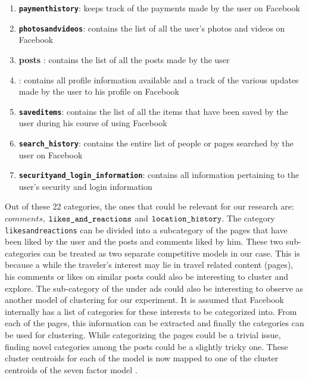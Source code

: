 \begin{enumerate}[i]
   \item \textbf{\texttt{payment\textunderscore history}}: keeps track of the payments made by the user on Facebook
   \item \textbf{\texttt{photos\textunderscore and\textunderscore videos}}: contains the list of all the user's photos and videos on Facebook
   \item \textbf{posts} : contains the list of all the posts made by the user
   \item \textbf{}: contains all profile information available and a track of the various updates made by the user to his profile on Facebook
   \item \textbf{\texttt{saved\textunderscore items}}: contains the list of all the items that have been saved by the user during his course of using Facebook
   \item \textbf{\texttt{search{\_}history}}: contains the entire list of people or pages searched by the user on Facebook
   \item \textbf{\texttt{security\textunderscore and{\_}login{\_}information}}: contains all information pertaining to the user's security and login information
  
\end{enumerate}

Out of these 22 categories, the ones that could be relevant for our research are: $comments$, $\texttt{likes\textunderscore and\textunderscore reactions}$ and $\texttt{location\textunderscore history}$. The category \texttt{likes\textunderscore and\textunderscore reactions} can be divided into a subcategory of the pages that have been liked by the user and the posts and comments liked by him. These two sub-categories can be treated as two separate competitive models in our case. This is because a while the traveler's interest may lie in travel related content (pages), his comments or likes on similar posts could also be interesting to cluster and explore. The sub-category of the  under ads could also be interesting to observe as another model of clustering for our experiment. It is assumed that Facebook internally has a list of categories for these interests to be categorized into. From each of the pages, this information can be extracted and finally the categories can be used for clustering. While categorizing the pages could be a trivial issue, finding novel categories among the posts could be a slightly tricky one. These cluster centroids for each of the model is now mapped to one of the cluster centroids of the seven factor model \cite{sertkan2018mapping}.

